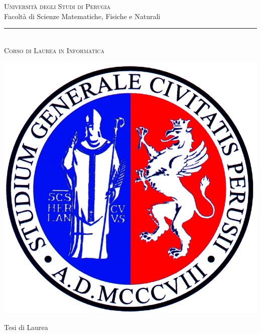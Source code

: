 \documentclass[a4paper,12pt]{report}
\title{\begin{large}\textbf{\titolotesi}\end{large}}
\author{\laureando}
\begin{document}
\begin{titlepage}
 \begin{center}
\textsc{\Large Universit\`a degli Studi di Perugia}\medskip\\

{\Large Facolt\`a di Scienze Matematiche, Fisiche e Naturali}\medskip\\

\rule{10mm}{0.01mm}\medskip\\

{\small \textsc{Corso di Laurea in Informatica}}\medskip\\


\vspace*{5mm}

\includegraphics[scale=0.2]{immagini/logouni.png}


\Large Tesi di Laurea \par\bigskip




\end{center}
\end{titlepage}
\end{document}
